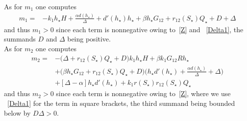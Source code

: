 \documentclass[reqno,11pt]{amsart}
\numberwithin{equation}{section}
\begin{document}
\begin{appendix}
 As for $m_1$ one computes
\begin{align*}
m_1=&
 - k_1 h_\star H +\frac{\alpha  d(h_\star)}{\Delta}+d'(h_\star)  h_\star+\beta  h_\star G_{12} +r_{12}(S_\star) Q_\star +D+\Delta
\end{align*}
and thus $m_1>0$ since each term is nonnegative owing to~\eqref{Z} and ~\eqref{Delta1}, the summands $D$ and $\Delta$ being positive.\\ 


As for $m_2$ one computes
\begin{align*}
m_2=&-\Big(  \Delta +  r_{12}(S_\star) Q_\star +D\Big) k_1 h_\star H +  \beta k_1 G_{12} R h_\star\\
& +\Big(\beta  h_\star G_{12} +r_{12}(S_\star) Q_\star +D\Big)\Big(h_\star d'(h_\star) +\frac{\alpha d(h_\star)}{\Delta} +\Delta\Big)\\
& +[\Delta -\alpha] h_\star d'(h_\star)+ k_1r (S_\star )  r_{12}(S_\star) Q_\star
 \end{align*}
and thus $m_2>0$ since each term is nonnegative owing to~\eqref{Z}, where we use ~\eqref{Delta1}  for the term in square brackets, the third summand being bounded below by $D\Delta>0$.\\


\end{appendix}
\end{document}
